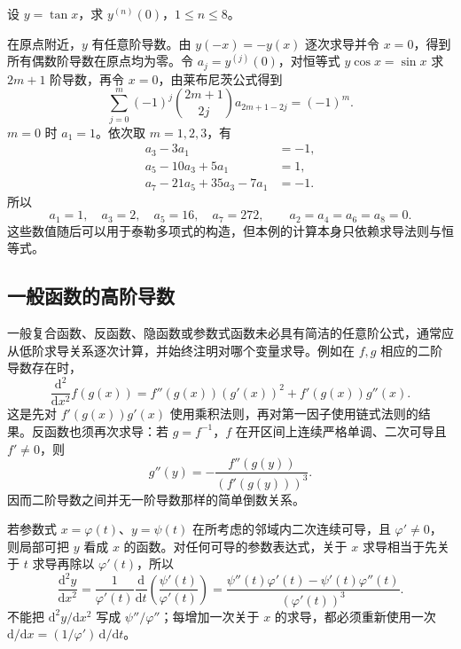 \begin{example}
\label{ex:tangent-derivatives-zero-through-eight}
设 $y=\tan x$，求 $y^{(n)}(0)$，$1\leq n\leq8$。
\end{example}
\begin{solve}
在原点附近，$y$ 有任意阶导数。由 $y(-x)=-y(x)$ 逐次求导并令 $x=0$，得到所有偶数阶导数在原点均为零。令 $a_j=y^{(j)}(0)$，对恒等式 $y\cos x=\sin x$ 求 $2m+1$ 阶导数，再令 $x=0$，由莱布尼茨公式得到
\[
    \sum_{j=0}^m(-1)^j\binom{2m+1}{2j}a_{2m+1-2j}
    =(-1)^m.
\]
$m=0$ 时 $a_1=1$。依次取 $m=1,2,3$，有
\[
\begin{aligned}
    a_3-3a_1&=-1,\\
    a_5-10a_3+5a_1&=1,\\
    a_7-21a_5+35a_3-7a_1&=-1.
\end{aligned}
\]
所以
\[
    a_1=1,\quad a_3=2,\quad a_5=16,\quad a_7=272,
    \qquad a_2=a_4=a_6=a_8=0.
\]
这些数值随后可以用于泰勒多项式的构造，但本例的计算本身只依赖求导法则与恒等式。
\end{solve}

\subsection{一般函数的高阶导数}
\label{subsec:higher-derivatives-of-general-functions}

一般复合函数、反函数、隐函数或参数式函数未必具有简洁的任意阶公式，通常应从低阶求导关系逐次计算，并始终注明对哪个变量求导。例如在 $f,g$ 相应的二阶导数存在时，
\begin{equation}
\label{eq:second-derivative-of-composite-function}
    \frac{\mathrm d^2}{\mathrm dx^2}f(g(x))
    =f''(g(x))(g'(x))^2+f'(g(x))g''(x).
\end{equation}
这是先对 $f'(g(x))g'(x)$ 使用乘积法则，再对第一因子使用链式法则的结果。反函数也须再次求导：若 $g=f^{-1}$，$f$ 在开区间上连续严格单调、二次可导且 $f'\ne0$，则
\begin{equation}
\label{eq:second-derivative-of-inverse-function}
    g''(y)=-\frac{f''(g(y))}{(f'(g(y)))^3}.
\end{equation}
因而二阶导数之间并无一阶导数那样的简单倒数关系。

若参数式 $x=\varphi(t)$、$y=\psi(t)$ 在所考虑的邻域内二次连续可导，且 $\varphi'\ne0$，则局部可把 $y$ 看成 $x$ 的函数。对任何可导的参数表达式，关于 $x$ 求导相当于先关于 $t$ 求导再除以 $\varphi'(t)$，所以
\begin{equation}
\label{eq:parametric-second-derivative}
    \frac{\mathrm d^2y}{\mathrm dx^2}
    =\frac1{\varphi'(t)}\frac{\mathrm d}{\mathrm dt}
      \left(\frac{\psi'(t)}{\varphi'(t)}\right)
    =\frac{\psi''(t)\varphi'(t)-\psi'(t)\varphi''(t)}{(\varphi'(t))^3}.
\end{equation}
不能把 $\mathrm d^2y/\mathrm dx^2$ 写成 $\psi''/\varphi''$；每增加一次关于 $x$ 的求导，都必须重新使用一次 $\mathrm d/\mathrm dx=(1/\varphi')\,\mathrm d/\mathrm dt$。

